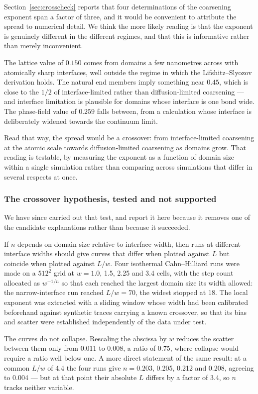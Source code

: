 \documentclass[preprint,12pt,authoryear]{elsarticle}
\begin{document}
Section~\ref{sec:crosscheck} reports that four determinations of the coarsening
exponent span a factor of three, and it would be convenient to attribute the
spread to numerical detail. We think the more likely reading is that the
exponent is genuinely different in the different regimes, and that this is
informative rather than merely inconvenient.

The lattice value of $0.150$ comes from domains a few nanometres across with
atomically sharp interfaces, well outside the regime in which the
Lifshitz--Slyozov derivation holds. The natural end members imply something near
$0.45$, which is close to the $1/2$ of interface-limited rather than
diffusion-limited coarsening --- and interface limitation is plausible for
domains whose interface is one bond wide. The phase-field value of $0.259$ falls
between, from a calculation whose interface is deliberately widened towards the
continuum limit.

Read that way, the spread would be a crossover: from interface-limited
coarsening at the atomic scale towards diffusion-limited coarsening as domains
grow. That reading is testable, by measuring the exponent as a function of
domain size within a single simulation rather than comparing across
simulations that differ in several respects at once.

\subsubsection*{The crossover hypothesis, tested and not supported}

We have since carried out that test, and report it here because it removes one
of the candidate explanations rather than because it succeeded.

If $n$ depends on domain size relative to interface width, then runs at
different interface widths should give curves that differ when plotted against
$L$ but coincide when plotted against $L/w$. Four isothermal Cahn--Hilliard
runs were made on a $512^2$ grid at $w = 1.0$, 1.5, 2.25 and 3.4 cells, with the
step count allocated as $w^{-1/n}$ so that each reached the largest domain size
its width allowed: the narrow-interface run reached $L/w = 70$, the widest
stopped at 18. The local exponent was extracted with a sliding window whose
width had been calibrated beforehand against synthetic traces carrying a known
crossover, so that its bias and scatter were established independently of the
data under test.

The curves do not collapse. Rescaling the abscissa by $w$ reduces the scatter
between them only from 0.011 to 0.008, a ratio of 0.75, where collapse would
require a ratio well below one. A more direct statement of the same result: at
a common $L/w$ of 4.4 the four runs give $n = 0.203$, 0.205, 0.212 and 0.208,
agreeing to 0.004 --- but at that point their absolute $L$ differs by a factor
of 3.4, so $n$ tracks neither variable.
\end{document}
